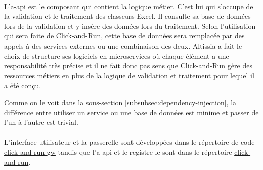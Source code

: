 \paragraph{}
L'\gls{a-api} est le composant qui contient la logique métier.
C'est lui qui s'occupe de la validation et le traitement des classeurs Excel.
Il consulte sa base de données lors de la validation et y insère des données lors du traitement.
Selon l'utilisation qui sera faite de Click-and-Run, cette base de données sera remplacée par des appels à des services externes ou une combinaison des deux.
Altissia a fait le choix de structure ses logiciels en microservices où chaque élément a une responsabilité très précise et il ne fait donc pas sens que Click-and-Run gère des ressources métiers en plus de la logique de validation et traitement pour lequel il a été conçu.

Comme on le voit dans la sous-section \ref{subsubsec:dependency-injection}, la différence entre utiliser un service ou une base de données est minime et passer de l'un à l'autre est trivial.

\paragraph{}
L'interface utilisateur et la passerelle sont développées dans le répertoire de code \href{https://github.com/click-and-run/click-and-run-gw}{click-and-run-gw}\fnmark{} tandis que l'\gls{a-api} et le registre le sont dans le répertoire \href{https://github.com/click-and-run/click-and-run}{click-and-run}\fnmark{}.




